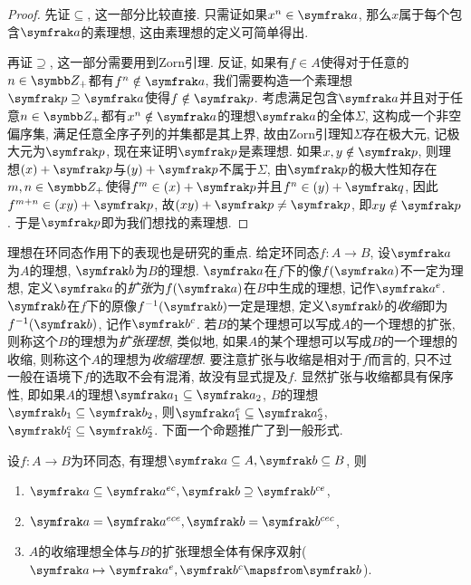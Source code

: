 \begin{proof}
  先证$\subseteq$, 这一部分比较直接. 只需证如果$x^n\in\ideal{a}$, 那么$x$属于每个包含$\ideal{a}$的素理想, 这由素理想的定义可简单得出.

  再证$\supseteq$, 这一部分需要用到Zorn引理. 反证, 如果有$f\in A$使得对于任意的$n\in\ZZ_+$都有$f^n\notin\ideal{a}$, 我们需要构造一个素理想$\ideal{p}\supseteq\ideal{a}$使得$f\notin\ideal{p}$. 考虑满足包含$\ideal{a}$并且对于任意$n\in\ZZ_+$都有$x^n\notin\ideal{a}$的理想$\ideal{a}$的全体$\Sigma$, 这构成一个非空偏序集, 满足任意全序子列的并集都是其上界, 故由Zorn引理知$\Sigma$存在极大元, 记极大元为$\ideal{p}$, 现在来证明$\ideal{p}$是素理想. 如果$x, y\notin\ideal{p}$, 则理想$(x)+\ideal{p}$与$(y)+\ideal{p}$不属于$\Sigma$, 由$\ideal{p}$的极大性知存在$m, n\in\ZZ_+$使得$f^m\in (x)+\ideal{p}$并且$f^n\in (y)+\ideal{q}$, 因此$f^{m+n}\in (xy)+\ideal{p}$, 故$(xy)+\ideal{p}\neq\ideal{p}$, 即$xy\notin\ideal{p}$. 于是$\ideal{p}$即为我们想找的素理想.
\end{proof}

理想在环同态作用下的表现也是研究的重点. 给定环同态$f\colon A\to B$, 设$\ideal{a}$为$A$的理想, $\ideal{b}$为$B$的理想. $\ideal{a}$在$f$下的像$f(\ideal{a})$不一定为理想, 定义$\ideal{a}$的\emph{扩张}为$f(\ideal{a})$在$B$中生成的理想, 记作$\ideal{a}^e$. $\ideal{b}$在$f$下的原像$f^{-1}(\ideal{b})$一定是理想, 定义$\ideal{b}$的\emph{收缩}即为$f^{-1}(\ideal{b})$, 记作$\ideal{b}^c$. 若$B$的某个理想可以写成$A$的一个理想的扩张, 则称这个$B$的理想为\emph{扩张理想}, 类似地, 如果$A$的某个理想可以写成$B$的一个理想的收缩, 则称这个$A$的理想为\emph{收缩理想}. 要注意扩张与收缩是相对于$f$而言的, 只不过一般在语境下$f$的选取不会有混淆, 故没有显式提及$f$. 显然扩张与收缩都具有保序性, 即如果$A$的理想$\ideal{a}_1\subseteq\ideal{a}_2$, $B$的理想$\ideal{b}_1\subseteq\ideal{b}_2$, 则$\ideal{a}_1^e\subseteq\ideal{a}_2^e$, $\ideal{b}_1^c\subseteq\ideal{b}_2^c$. 下面一个命题推广了到一般形式.

\begin{proposition}\label{prop:extencontrcorr}
  设$f\colon A\to B$为环同态, 有理想$\ideal{a}\subseteq A, \ideal{b}\subseteq B$, 则
  \begin{enumerate}
    \item $\ideal{a}\subseteq\ideal{a}^{ec}, \ideal{b}\supseteq\ideal{b}^{ce}$,
    \item $\ideal{a}=\ideal{a}^{ece}, \ideal{b}=\ideal{b}^{cec}$,
    \item\label{enum:prop-ec-corr} $A$的收缩理想全体与$B$的扩张理想全体有保序双射($\ideal{a}\mapsto\ideal{a}^e, \ideal{b}^c\mapsfrom\ideal{b}$).
  \end{enumerate}
\end{proposition}

